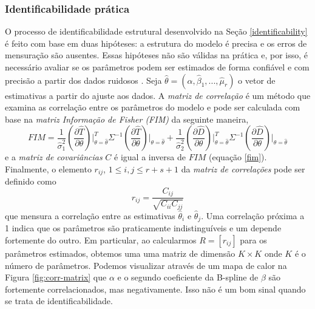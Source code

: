 \subsubsection{Identificabilidade prática}
\label{identificability-practical}

O processo de identificabilidade estrutural desenvolvido na Seção \ref{identificability} é feito com base em duas hipóteses: a estrutura do modelo é precisa e os erros de mensuração são ausentes. 
Essas hipóteses não são válidas na prática e, por isso, é necessário avaliar se os parâmetros podem ser estimados de forma confiável e com precisão a partir dos dados ruidosos \cite{miao2011}. 
Seja $\hat{\theta} = (\hat{\alpha}, \hat{\beta}_1, ...,\hat{\mu}_{r})$ o vetor de estimativas a partir do ajuste aos dados. 
A {\em matriz de correlação} é um método que examina as correlação entre os parâmetros do modelo e pode ser calculada com base na {\em matriz Informação de Fisher (FIM)} da seguinte maneira, 
\begin{equation}
    FIM = \frac{1}{\hat{\sigma}_1^2}\left(\frac{\partial \hat{T}}{\partial \theta}\right)\Bigg|_{\theta = \hat{\theta}}^{T}\Sigma^{-1}\left(\frac{\partial \hat{T}}{\partial \theta}\right)\Bigg|_{\theta = \hat{\theta}} + \frac{1}{\hat{\sigma}_2^2}\left(\frac{\partial \hat{D}}{\partial \theta}\right)\Bigg|_{\theta = \hat{\theta}}^{T}\Sigma^{-1}\left(\frac{\partial \hat{D}}{\partial \theta}\right)\Bigg|_{\theta = \hat{\theta}}
    \label{fim}
\end{equation}
e a {\em matriz de covariâncias} $C$ é igual a inversa de $FIM$ (equação \eqref{fim}). Finalmente, o elemento $r_{ij}$, $1 \le i,j \le r + s + 1$ da {\em matriz de correlações} pode ser definido como 
\begin{equation}
    r_{ij} = \frac{C_{ij}}{\sqrt{C_{ii}C_{jj}}}
    \label{correlation}
\end{equation}
que mensura a correlação entre as estimativas $\hat{\theta}_i$ e $\hat{\theta}_j$. 
Uma correlação próxima a 1 indica que os parâmetros são praticamente indistinguíveis e um depende fortemente do outro. 
Em particular, ao calcularmos $R = [r_{ij}]$ para os parâmetros estimados, obtemos uma uma matriz de dimensão $K \times K$ onde $K$ é o número de parâmetros. 
Podemos visualizar através de um mapa de calor na Figura \ref{fig:corr-matrix} que $\alpha$ e o segundo coeficiente da B-spline de $\beta$ são fortemente correlacionados, mas negativamente. Isso não é um bom sinal quando se trata de identificabilidade.

